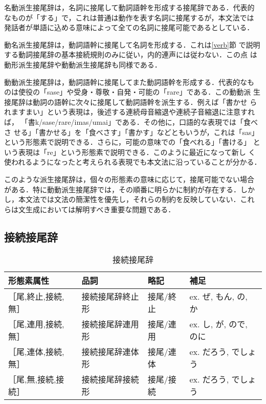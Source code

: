 名動派生接尾辞は，名詞に接尾して動詞語幹を形成する接尾辞である．代表的
なものが「する」で，これは普通は動作を表す名詞に接尾するが，本文法では
発話者が単語に込める意味によって全ての名詞に接尾可能であるとしている．

動名派生接尾辞は，動詞語幹に接尾して名詞を形成する．これは\ref{verb}節
で説明する動詞接尾辞の基本接続規則のみに従い，内的連声には従わない．この点
は動形派生接尾辞や動動派生接尾辞も同様である．

動動派生接尾辞は，動詞語幹に接尾してまた動詞語幹を形成する．代表的なも
のは使役の「sase」や受身・尊敬・自発・可能の「rare」である．この動動派
生接尾辞は動詞の語幹に次々に接尾して動詞語幹を派生する．例えば「書かせ
られますまい」という表現は，後述する連続母音縮退や連続子音縮退に注意すれば，
「書k/sase/rare/imas/umai」である．その他に，口語的な表現では「食べさ
せる」「書かせる」を「食べさす」「書かす」などともいうが，これは「sas」
という形態素で説明できる．さらに，可能の意味での「食べれる」「書ける」
という表現は「re」という形態素で説明できる．このように最近になって新し
く使われるようになったと考えられる表現でも本文法に沿っていることが分かる．

このような派生接尾辞は，個々の形態素の意味に応じて，接尾可能でない場合
がある．特に動動派生接尾辞では，その順番に明らかに制約が存在する．しか
し，本文法では文法の簡潔性を優先し，それらの制約を反映していない．これ
らは文生成においては解明すべき重要な問題である．

\subsection{接続接尾辞}
\begin{table*}
\begin{center}
\begin{tabular}{|l|l|l|l|}
\hline
形態素属性 & 品詞 & 略記 & 補足 \\
\hline
［尾,終止,接続,無］ & 接続接尾辞終止形 & 接尾/終止 & ex. ぜ, もん, の, か \\
［尾,連用,接続,無］ & 接続接尾辞連用形 & 接尾/連用 & ex. し, が, ので, のに \\
［尾,連体,接続,無］ & 接続接尾辞連体形 & 接尾/連体 & ex. だろう, でしょう \\
［尾,無,接続,接続］ & 接続接尾辞接続形 & 接尾/接続 & ex. だろう, でしょう \\
\hline
\end{tabular}
\end{center}
\caption{接続接尾辞}
\label{setsuzoku-list}
\end{table*}

